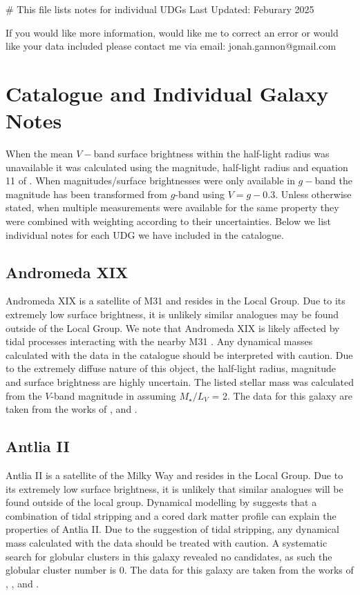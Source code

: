 # This file lists notes for individual UDGs 
Last Updated: Feburary 2025

If you would like more information, would like me to correct an error or would like your data included please contact me via email:
jonah.gannon@gmail.com

\section{Catalogue and Individual Galaxy Notes} \label{sec:catalogue}
When the mean $V-$band surface brightness within the half-light radius was unavailable it was calculated using the magnitude, half-light radius and equation 11 of \citet{Graham2005}.  When magnitudes/surface brightnesses were only available in $g-$band the magnitude has been transformed from $g$-band using $V=g-0.3$. Unless otherwise stated, when multiple measurements were available for the same property they were combined with weighting according to their uncertainties. Below we list individual notes for each UDG we have included in the catalogue.

\subsection{Andromeda XIX}
Andromeda XIX is a satellite of M31 and resides in the Local Group. Due to its extremely low surface brightness, it is unlikely similar analogues may be found outside of the Local Group. We note that Andromeda XIX is likely affected by tidal processes interacting with the nearby M31 \citep{Collins2020, Collins2022}. Any dynamical masses calculated with the data in the catalogue should be interpreted with caution. Due to the extremely diffuse nature of this object, the half-light radius, magnitude and surface brightness are highly uncertain. The listed stellar mass was calculated from the $V$-band magnitude in \citet{Martin2016} assuming $M_{\star}/L_{V}$ = 2. The data for this galaxy are taken from the works of \citet{Martin2016}, \citet{Collins2020} and \citet{Gannon2021}.

\subsection{Antlia II}
Antlia II is a satellite of the Milky Way and resides in the Local Group. Due to its extremely low surface brightness, it is unlikely that similar analogues will be found outside of the local group. Dynamical modelling by \citet{torrealba2019} suggests that a combination of tidal stripping and a cored dark matter profile can explain the properties of Antlia II. Due to the suggestion of tidal stripping, any dynamical mass calculated with the data should be treated with caution. A systematic search for globular clusters in this galaxy revealed no candidates, as such the globular cluster number is 0. The data for this galaxy are taken from the works of \citet{mcconnachie2012}, \citet{torrealba2019}, \citet{Ji2021} and \citet{Huang2021}.

